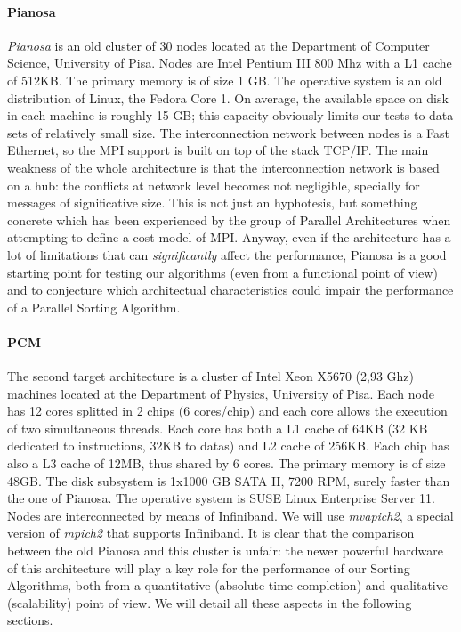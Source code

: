 \paragraph{Pianosa}
\textit{Pianosa} is an old cluster of 30 nodes located at the Department of Computer Science, University of Pisa. Nodes are Intel Pentium III 800 Mhz with a L1 cache of 512KB. The primary memory is of size 1 GB. The operative system is an old distribution of Linux, the Fedora Core 1. On average, the available space on disk in each machine is roughly 15 GB; this capacity obviously limits our tests to data sets of relatively small size. The interconnection network between nodes is a Fast Ethernet, so the MPI support is built on top of the stack TCP/IP. The main weakness of the whole architecture is that the interconnection network is based on a hub: the conflicts at network level becomes not negligible, specially for messages of significative size. This is not just an hyphotesis, but something concrete which has been experienced by the group of Parallel Architectures when attempting to define a cost model of MPI. Anyway, even if the architecture has a lot of limitations that can \textit{significantly} affect the performance, Pianosa is a good starting point for testing our algorithms (even from a functional point of view) and to conjecture which architectual characteristics could impair the performance of a Parallel Sorting Algorithm.

\paragraph{PCM}
\label{PCM}
The second target architecture is a cluster of Intel Xeon X5670 (2,93 Ghz) machines located at the Department of Physics, University of Pisa. Each node has 12 cores splitted in 2 chips (6 cores/chip) and each core allows the execution of two simultaneous threads. Each core has both a L1 cache of 64KB (32 KB dedicated to instructions, 32KB to datas) and L2 cache of 256KB. Each chip has also a L3 cache of 12MB, thus shared by 6 cores. The primary memory is of size 48GB. The disk subsystem is 1x1000 GB SATA II, 7200 RPM, surely faster than the one of Pianosa. The operative system is SUSE Linux Enterprise Server 11. Nodes are interconnected by means of Infiniband. We will use \textit{mvapich2}, a special version of \textit{mpich2} that supports Infiniband. It is clear that the comparison between the old Pianosa and this cluster is unfair: the newer powerful hardware of this architecture will play a key role for the performance of our Sorting Algorithms, both from a quantitative (absolute time completion) and qualitative (scalability) point of view. We will detail all these aspects in the following sections.

